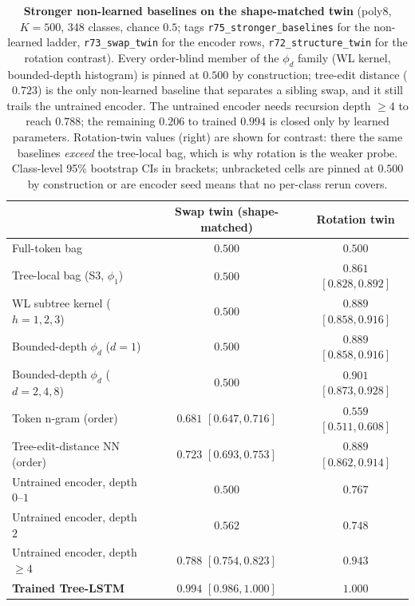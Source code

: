\begin{table}[h]
\centering
\begin{threeparttable}
\caption{\textbf{Stronger non-learned baselines on the shape-matched twin} (poly8, $K{=}500$, 348 classes, chance $0.5$; tags \texttt{r75\_stronger\_baselines} for the non-learned ladder, \texttt{r73\_swap\_twin} for the encoder rows, \texttt{r72\_structure\_twin} for the rotation contrast). Every order-blind member of the $\phi_d$ family (WL kernel, bounded-depth histogram) is pinned at $0.500$ by construction; tree-edit distance ($0.723$) is the only non-learned baseline that separates a sibling swap, and it still trails the untrained encoder. The untrained encoder needs recursion depth $\geq 4$ to reach $0.788$; the remaining $0.206$ to trained $0.994$ is closed only by learned parameters. Rotation-twin values (right) are shown for contrast: there the same baselines \emph{exceed} the tree-local bag, which is why rotation is the weaker probe. Class-level 95\% bootstrap CIs in brackets; unbracketed cells are pinned at $0.500$ by construction or are encoder seed means that no per-class rerun covers.}
\label{tab:stronger_baselines}
\small
\begin{tabular}{l cc}
\toprule
 & Swap twin (shape-matched) & Rotation twin \\
\midrule
Full-token bag & $0.500$ & $0.500$ \\
Tree-local bag (S3, $\phi_1$) & $0.500$ & $0.861$ $[0.828,0.892]$ \\
WL subtree kernel ($h{=}1,2,3$) & $0.500$ & $0.889$ $[0.858,0.916]$ \\
Bounded-depth $\phi_d$ ($d{=}1$) & $0.500$ & $0.889$ $[0.858,0.916]$ \\
Bounded-depth $\phi_d$ ($d{=}2,4,8$) & $0.500$ & $0.901$ $[0.873,0.928]$ \\
Token n-gram (order) & $0.681$ $[0.647,0.716]$ & $0.559$ $[0.511,0.608]$ \\
Tree-edit-distance NN (order) & $0.723$ $[0.693,0.753]$ & $0.889$ $[0.862,0.914]$ \\
\midrule
Untrained encoder, depth $0$--$1$ & $0.500$ & $0.767$ \\
Untrained encoder, depth $2$ & $0.562$ & $0.748$ \\
Untrained encoder, depth $\geq 4$ & $0.788$ $[0.754,0.823]$ & $0.943$ \\
\midrule
\textbf{Trained Tree-LSTM} & $\mathbf{0.994}$ $[0.986,1.000]$ & $\mathbf{1.000}$ \\
\bottomrule
\end{tabular}
\end{threeparttable}
\end{table}

